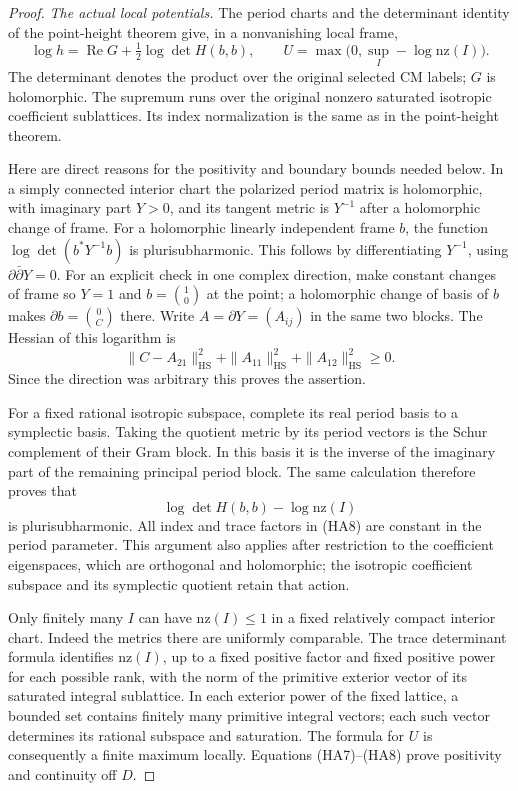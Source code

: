 \begin{proof}
\emph{The actual local potentials.}
The period charts and the determinant identity of the point-height
theorem give, in a nonvanishing local frame,
\[
 \log h=\operatorname{Re}G+\tfrac12\log\det H(b,b),
 \qquad
 U=\max\bigl(0,\sup_I-\log\mathrm{nz}(I)\bigr).
 \tag{HA7}
\]
The determinant denotes the product over the original selected CM
labels; $G$ is holomorphic.  The supremum runs over the original
nonzero saturated isotropic coefficient sublattices.  Its index
normalization is the same as in the point-height theorem.

Here are direct reasons for the positivity and boundary bounds
needed below.  In a simply connected interior chart the polarized
period matrix is holomorphic, with imaginary part $Y>0$, and its
tangent metric is $Y^{-1}$ after a holomorphic change of frame.
For a holomorphic linearly independent frame $b$, the function
$\log\det(b^*Y^{-1}b)$ is plurisubharmonic.  This follows by
differentiating $Y^{-1}$, using $\partial\bar\partial Y=0$.
For an explicit check in one complex direction, make constant
changes of frame so $Y=1$ and $b=\binom{1}{0}$ at the point;
a holomorphic change of basis of $b$ makes
$\partial b=\binom{0}{C}$ there.  Write
$A=\partial Y=(A_{ij})$ in the same two blocks.  The Hessian
of this logarithm is
\[
       \|C-A_{21}\|_{\mathrm{HS}}^2
          +\|A_{11}\|_{\mathrm{HS}}^2
          +\|A_{12}\|_{\mathrm{HS}}^2\ge0.
\]
Since the direction was arbitrary this proves the assertion.

For a fixed rational isotropic subspace, complete its real period
basis to a symplectic basis.  Taking the quotient metric by its
period vectors is the Schur complement of their Gram block.  In
this basis it is the inverse of the imaginary part of the remaining
principal period block.  The same calculation therefore proves that
\[
          \log\det H(b,b)-\log\mathrm{nz}(I)
 \tag{HA8}
\]
is plurisubharmonic.  All index and trace factors in (HA8) are
constant in the period parameter.  This argument also applies
after restriction to the coefficient eigenspaces, which are
orthogonal and holomorphic; the isotropic coefficient subspace
and its symplectic quotient retain that action.

Only finitely many $I$ can have $\mathrm{nz}(I)\le1$ in a
fixed relatively compact interior chart.  Indeed the metrics
there are uniformly comparable.  The trace determinant formula
identifies $\mathrm{nz}(I)$, up to a fixed positive factor and
fixed positive power for each possible rank, with the norm of
the primitive exterior vector of its saturated integral sublattice.
In each exterior power of the fixed lattice,
a bounded set contains finitely many primitive integral vectors;
each such vector determines its rational subspace and saturation.
The formula for $U$ is consequently a finite maximum locally.
Equations (HA7)--(HA8) prove positivity and continuity off $D$.


\end{proof}
